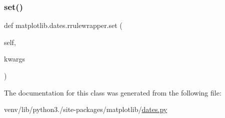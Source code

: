 \subsubsection{\texorpdfstring{set()}{set()}}
{\footnotesize\ttfamily def matplotlib.\+dates.\+rrulewrapper.\+set (\begin{DoxyParamCaption}\item[{}]{self,  }\item[{}]{kwargs }\end{DoxyParamCaption})}



The documentation for this class was generated from the following file\+:\begin{DoxyCompactItemize}
\item 
venv/lib/python3./site-\/packages/matplotlib/\hyperlink{dates_8py}{dates.\+py}\end{DoxyCompactItemize}
